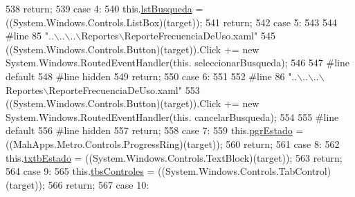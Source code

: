 \begin{DoxyCode}
538             \textcolor{keywordflow}{return};
539             \textcolor{keywordflow}{case} 4:
540             this.\hyperlink{class_proyecto___integrador__3_1_1_reportes_1_1_reporte_frecuencia_de_uso_a94c9a9f5043efbb40679b90827da897e}{lstBusqueda} = ((System.Windows.Controls.ListBox)(target));
541             \textcolor{keywordflow}{return};
542             \textcolor{keywordflow}{case} 5:
543             
544 \textcolor{preprocessor}{            #line 85 "..\(\backslash\)..\(\backslash\)..\(\backslash\)Reportes\(\backslash\)ReporteFrecuenciaDeUso.xaml"}
545 \textcolor{preprocessor}{}            ((System.Windows.Controls.Button)(target)).Click += \textcolor{keyword}{new} System.Windows.RoutedEventHandler(\textcolor{keyword}{this}.
      seleccionarBusqueda);
546             
547 \textcolor{preprocessor}{            #line default}
548 \textcolor{preprocessor}{}\textcolor{preprocessor}{            #line hidden}
549 \textcolor{preprocessor}{}            \textcolor{keywordflow}{return};
550             \textcolor{keywordflow}{case} 6:
551             
552 \textcolor{preprocessor}{            #line 86 "..\(\backslash\)..\(\backslash\)..\(\backslash\)Reportes\(\backslash\)ReporteFrecuenciaDeUso.xaml"}
553 \textcolor{preprocessor}{}            ((System.Windows.Controls.Button)(target)).Click += \textcolor{keyword}{new} System.Windows.RoutedEventHandler(\textcolor{keyword}{this}.
      cancelarBusqueda);
554             
555 \textcolor{preprocessor}{            #line default}
556 \textcolor{preprocessor}{}\textcolor{preprocessor}{            #line hidden}
557 \textcolor{preprocessor}{}            \textcolor{keywordflow}{return};
558             \textcolor{keywordflow}{case} 7:
559             this.\hyperlink{class_proyecto___integrador__3_1_1_reportes_1_1_reporte_frecuencia_de_uso_a40046fa9e14c98adb20dbc8f99f83842}{pgrEstado} = ((MahApps.Metro.Controls.ProgressRing)(target));
560             \textcolor{keywordflow}{return};
561             \textcolor{keywordflow}{case} 8:
562             this.\hyperlink{class_proyecto___integrador__3_1_1_reportes_1_1_reporte_frecuencia_de_uso_ab5dad4dbd48cba1238ec0914d940c499}{txtbEstado} = ((System.Windows.Controls.TextBlock)(target));
563             \textcolor{keywordflow}{return};
564             \textcolor{keywordflow}{case} 9:
565             this.\hyperlink{class_proyecto___integrador__3_1_1_reportes_1_1_reporte_frecuencia_de_uso_a33854de6395bbc0369295eec9598bba5}{tbsControles} = ((System.Windows.Controls.TabControl)(target));
566             \textcolor{keywordflow}{return};
567             \textcolor{keywordflow}{case} 10:

\end{DoxyCode}
